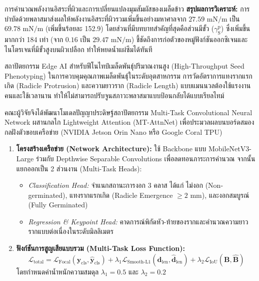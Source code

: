 \begin{examplebox}{การคำนวณพลังงานอิสระที่ผิวและการเปลี่ยนแปลงมุมสัมผัสของเมล็ดข้าว}
\textbf{สรุปผลการวิเคราะห์:} การบำบัดด้วยพลาสมาส่งผลให้พลังงานอิสระที่ผิวรวมเพิ่มขึ้นอย่างมหาศาลจาก $27.59 \text{ mN/m}$ เป็น $69.78 \text{ mN/m}$ (เพิ่มขึ้นร้อยละ 152.9) โดยส่วนที่มีบทบาทสำคัญที่สุดคือส่วนมีขั้ว ($\gamma_{\text{S}}^{\text{p}}$) ซึ่งเพิ่มขึ้นมากกว่า 184 เท่า (จาก $0.16$ เป็น $29.47 \text{ mN/m}$) ชี้ชัดถึงการก่อตัวของหมู่ฟังก์ชันออกซิเจนและไนโตรเจนที่มีขั้วสูงบนผิวเปลือก ทำให้หยดน้ำแผ่ซึมได้ทันที
\end{examplebox}

\begin{aibox}{สถาปัตยกรรม Edge AI สำหรับฟีโนไทป์เมล็ดพันธุ์ปริมาณงานสูง (High-Throughput Seed Phenotyping)}
ในการควบคุมคุณภาพเมล็ดพันธุ์ในระดับอุตสาหกรรม การวัดอัตราการแทงรากแรกเกิด (Radicle Protrusion) และความยาวราก (Radicle Length) แบบแมนนวลต้องใช้แรงงานคนและใช้เวลานาน ทำให้ไม่สามารถปรับจูนสภาวะพลาสมาแบบป้อนกลับได้แบบเรียลไทม์

คณะผู้วิจัยจึงได้พัฒนาโมเดลปัญญาประดิษฐ์สถาปัตยกรรม Multi-Task Convolutional Neural Network ผสานกลไก Lightweight Attention (MT-AttnNet) เพื่อประมวลผลบนบอร์ดสมองกลฝังตัวขอบเครือข่าย (NVIDIA Jetson Orin Nano หรือ Google Coral TPU)

\begin{enumerate}
    \item \textbf{โครงสร้างเครือข่าย (Network Architecture):} ใช้ Backbone แบบ MobileNetV3-Large ร่วมกับ Depthwise Separable Convolutions เพื่อลดทอนภาระการคำนวณ จากนั้นแยกออกเป็น 2 ส่วนงาน (Multi-Task Heads):
    \begin{itemize}
        \item \textit{Classification Head:} จำแนกสถานะการงอก 3 คลาส ได้แก่ ไม่งอก (Non-germinated), แทงรากแรกเกิด (Radicle Emergence $\ge 2\text{ mm}$), และงอกสมบูรณ์ (Fully Germinated)
        \item \textit{Regression \& Keypoint Head:} คาดการณ์พิกัดหัว-ท้ายของรากและคำนวณความยาวรากแบบต่อเนื่องในระดับมิลลิเมตร
    \end{itemize}
    
    \item \textbf{ฟังก์ชันการสูญเสียแบบรวม (Multi-Task Loss Function):}
    \begin{equation}
        \mathcal{L}_{\text{total}} = \mathcal{L}_{\text{Focal}}(\mathbf{y}_{\text{cls}}, \hat{\mathbf{y}}_{\text{cls}}) + \lambda_1 \mathcal{L}_{\text{Smooth-L1}}(\mathbf{d}_{\text{len}}, \hat{\mathbf{d}}_{\text{len}}) + \lambda_2 \mathcal{L}_{\text{IoU}}(\mathbf{B}, \hat{\mathbf{B}})
    \end{equation}
    โดยกำหนดค่าน้ำหนักความสมดุล $\lambda_1 = 0.5$ และ $\lambda_2 = 0.2$
    

\end{enumerate}
\end{aibox}
